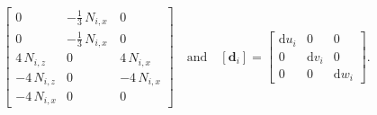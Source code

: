 \begin{subequations}
\begin{align}
\begin{bmatrix}
			0 &  - \tfrac{1}{3} \,  N_{i,x} \,  & 0  \\
			0 &  - \tfrac{1}{3} \, N_{i,x} \,  & 0  \\
			4 \,  N_{i,z}  &  0 & 4 \,  N_{i,x}   \\
			-4 \,  N_{i,z} &  0 & - 4 \,  N_{i,x}  \\
			- 4 \,  N_{i,x} &  0 & 0  \end{bmatrix}   \quad \text{and} \quad	[\mathbf{d}_i] = \begin{bmatrix}
			\mathrm{d} u_i & 0  & 0  \\
			0 &  \mathrm{d} v_i   & 0  \\
			0 & 0 & \mathrm{d} w_i \end{bmatrix} .
	\end{align}
\end{subequations}

